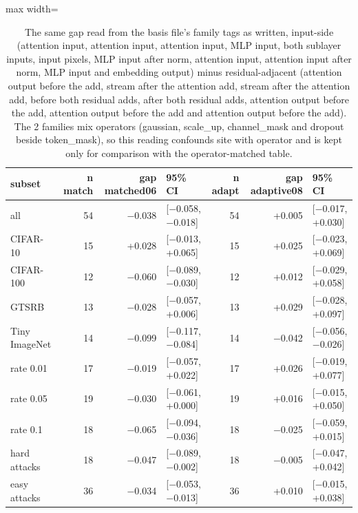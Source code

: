 \begin{table}[htbp]
\centering
\small
\caption{The same gap read from the basis file's family tags as written, input-side (attention input, attention input, attention input, MLP input, both sublayer inputs, input pixels, MLP input after norm, attention input, attention input after norm, MLP input and embedding output) minus residual-adjacent (attention output before the add, stream after the attention add, stream after the attention add, before both residual adds, after both residual adds, attention output before the add, attention output before the add and attention output before the add). The 2 families mix operators (gaussian, scale_up, channel_mask and dropout beside token_mask), so this reading confounds site with operator and is kept only for comparison with the operator-matched table.}
\label{tab:family-split-confounded}
\begin{adjustbox}{max width=\linewidth}
\begin{tabular}{lrrlrrl}
\toprule
subset & n match & gap matched06 & 95\% CI & n adapt & gap adaptive08 & 95\% CI \\
\midrule
all & 54 & $-$0.038 & [$-$0.058, $-$0.018] & 54 & +0.005 & [$-$0.017, +0.030] \\
CIFAR-10 & 15 & +0.028 & [$-$0.013, +0.065] & 15 & +0.025 & [$-$0.023, +0.069] \\
CIFAR-100 & 12 & $-$0.060 & [$-$0.089, $-$0.030] & 12 & +0.012 & [$-$0.029, +0.058] \\
GTSRB & 13 & $-$0.028 & [$-$0.057, +0.006] & 13 & +0.029 & [$-$0.028, +0.097] \\
Tiny ImageNet & 14 & $-$0.099 & [$-$0.117, $-$0.084] & 14 & $-$0.042 & [$-$0.056, $-$0.026] \\
rate 0.01 & 17 & $-$0.019 & [$-$0.057, +0.022] & 17 & +0.026 & [$-$0.019, +0.077] \\
rate 0.05 & 19 & $-$0.030 & [$-$0.061, +0.000] & 19 & +0.016 & [$-$0.015, +0.050] \\
rate 0.1 & 18 & $-$0.065 & [$-$0.094, $-$0.036] & 18 & $-$0.025 & [$-$0.059, +0.015] \\
hard attacks & 18 & $-$0.047 & [$-$0.089, $-$0.002] & 18 & $-$0.005 & [$-$0.047, +0.042] \\
easy attacks & 36 & $-$0.034 & [$-$0.053, $-$0.013] & 36 & +0.010 & [$-$0.015, +0.038] \\
\bottomrule
\end{tabular}
\end{adjustbox}
\end{table}
